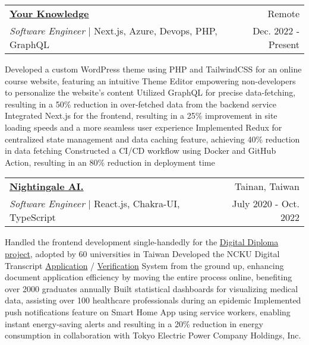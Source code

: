 \newcommand{\resumeExpEntry}[5]{
  \vspace{5pt}\item
    \begin{tabular*}{0.97\textwidth}{l@{\extracolsep{\fill}}r}
      \textbf{#1} & \small #2 \\
      \textit{#3} | #4 & \small #5 \\
    \end{tabular*}\vspace{-5pt}
}

\resumeExpEntry
{\href{https://yourknowledge.online}{Your Knowledge}}
{Remote}
{Software Engineer}
{Next.js, Azure, Devops, PHP, GraphQL}
{Dec. 2022 - Present}
{
  \resumeItemListStart
    \resumeItem
    {Developed a custom WordPress theme using PHP and TailwindCSS for an online course website, featuring an intuitive Theme Editor empowering non-developers to personalize the website's content}
    \resumeItem
    {Utilized GraphQL for precise data-fetching, resulting in a 50\% reduction in over-fetched data from the backend service}
    \resumeItem
    {Integrated Next.js for the frontend, resulting in a 25\% improvement in site loading speeds and a more seamless user experience}
    \resumeItem
    {Implemented Redux for centralized state management and data caching feature, achieving 40\% reduction in data fetching}
    \resumeItem
    {Constructed a CI/CD workflow using Docker and GitHub Action, resulting in an 80\% reduction in deployment time}
  \resumeItemListEnd
}

\resumeExpEntry
{\href{https://19gale.ai}{Nightingale AI.}}
{Tainan, Taiwan}
{Software Engineer}
{React.js, Chakra-UI, TypeScript}
{July 2020 - Oct. 2022}
{
  \resumeItemListStart
    \resumeItem
    {Handled the frontend development single-handedly for the \href{https://dcert.moe.gov.tw}{Digital Diploma project}, adopted by 60 universities in Taiwan}
    \resumeItem
    {Developed the NCKU Digital Transcript \href{https://stuapply.diploma.ncku.edu.tw/release}{Application} / \href{https://stuapply.diploma.ncku.edu.tw/verify}{Verification} System from the ground up, enhancing document application efficiency by moving the entire process online, benefiting over 2000 graduates annually}
    \resumeItem
    {Built statistical dashboards for visualizing medical data, assisting over 100 healthcare professionals during an epidemic}
    \resumeItem
    {Implemented push notifications feature on Smart Home App using service workers, enabling instant energy-saving alerts and resulting in a 20\% reduction in energy consumption in collaboration with Tokyo Electric Power Company Holdings, Inc.}
  \resumeItemListEnd
}

